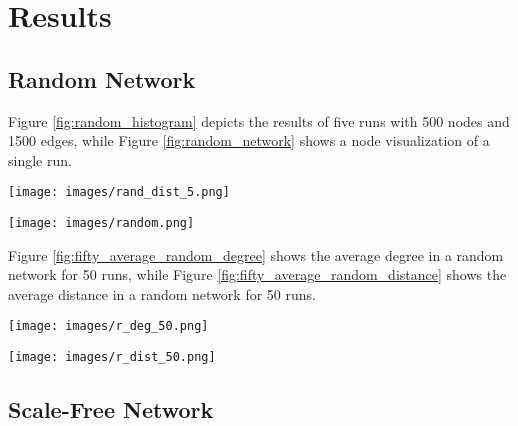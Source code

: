 \documentclass[journal]{IEEEtran}
\begin{document}
\newpage
\section{Results}
\subsection{Random Network}
\noindent Figure \ref{fig:random_histogram} depicts the results of five runs with 500 nodes and 1500 edges, while Figure \ref{fig:random_network} shows a node visualization of a single run.   

\begingroup
    \centering
    \medskip
    \texttt{[image: images/rand\_dist\_5.png]}
    \label{fig:random_histogram}
    \medskip
\endgroup

\bigskip
\bigskip
\bigskip

\begingroup
    \centering
    \medskip
    \texttt{[image: images/random.png]}
    \label{fig:random_network}
    \medskip
\endgroup

\newpage

\noindent Figure \ref{fig:fifty_average_random_degree} shows the average degree in a random network for 50 runs, while Figure \ref{fig:fifty_average_random_distance} shows the average distance in a random network for 50 runs.


\begingroup
    \centering
    \medskip
    \texttt{[image: images/r\_deg\_50.png]}
    \label{fig:fifty_average_random_degree}
    \medskip
\endgroup

\bigskip
\bigskip
\bigskip

\begingroup
    \centering
    \medskip
    \texttt{[image: images/r\_dist\_50.png]}
    \label{fig:fifty_average_random_distance}
    \medskip
\endgroup

\newpage

\subsection{Scale-Free Network}
\end{document}
